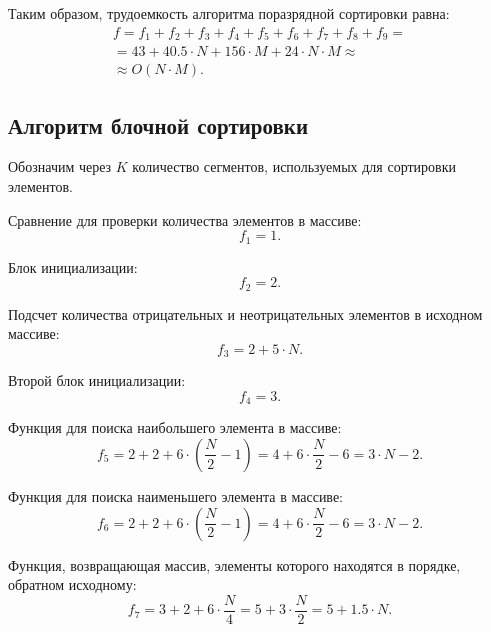 Таким образом, трудоемкость алгоритма поразрядной сортировки равна:
\begin{equation}
\begin{gathered}
f = f_1 + f_2 + f_3 + f_4 + f_5 + f_6 + f_7 + f_8 + f_9 = \\ = 43 + 40.5 \cdot N + 156 \cdot M + 24 \cdot N \cdot M \approx \\ \approx O(N \cdot M).
\end{gathered}
\end{equation}

\subsection{Алгоритм блочной сортировки}

Обозначим через $K$ количество сегментов, используемых для сортировки элементов.

Сравнение для проверки количества элементов в массиве:
\begin{equation}
f_1 = 1.
\end{equation}

Блок инициализации:
\begin{equation}
f_2 = 2.
\end{equation}

Подсчет количества отрицательных и неотрицательных элементов в исходном массиве:
\begin{equation}
f_3 = 2 + 5 \cdot N.
\end{equation}

Второй блок инициализации:
\begin{equation}
f_4 = 3.
\end{equation}

Функция для поиска наибольшего элемента в массиве:
\begin{equation}
f_5 = 2 + 2 + 6 \cdot (\frac{N}{2} - 1) = 4 + 6 \cdot \frac{N}{2} - 6 = 3 \cdot N - 2.
\end{equation}

Функция для поиска наименьшего элемента в массиве:
\begin{equation}
f_6 = 2 + 2 + 6 \cdot (\frac{N}{2} - 1) = 4 + 6 \cdot \frac{N}{2} - 6 = 3 \cdot N - 2.
\end{equation}

Функция, возвращающая массив, элементы которого находятся в порядке, обратном исходному:
\begin{equation}
f_7 = 3 + 2 + 6 \cdot \frac{N}{4} = 5 + 3 \cdot \frac{N}{2} = 5 + 1.5 \cdot N.
\end{equation}

